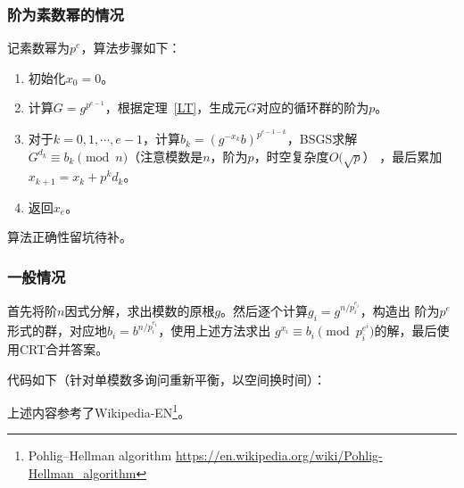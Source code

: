 \subsubsection{阶为素数幂的情况}

记素数幂为$p^e$，算法步骤如下：

\begin{enumerate}
    \item 初始化$x_0=0$。
    \item 计算$G=g^{p^{e-1}}$，根据定理~\ref{LT}，生成元$G$对应的循环群的阶为$p$。
    \item 对于$k=0,1,\cdots,e-1$，计算$b_k=(g^{-x_k}b)^{p^{e-1-k}}$，BSGS求解
    $G^{d_k}\equiv b_k\pmod{n}$（注意模数是$n$，阶为$p$，时空复杂度$O(\sqrt{p}$）
    ，最后累加$x_{k+1}=x_k+p^kd_k$。
    \item 返回$x_e$。
\end{enumerate}

算法正确性留坑待补。

\subsubsection{一般情况}
首先将阶$n$因式分解，求出模数的原根$g$。然后逐个计算$g_i=g^{n/p_i^{e_i}}$，构造出
阶为$p^e$形式的群，对应地$b_i=b^{n/p_i^{e_i}}$，使用上述方法求出
$g^{x_i}\equiv b_i\pmod{p_i^{e^i}}$的解，最后使用CRT合并答案。

代码如下（针对单模数多询问重新平衡，以空间换时间）：


上述内容参考了Wikipedia-EN\footnote{
    Pohlig–Hellman algorithm
    \url{https://en.wikipedia.org/wiki/Pohlig-Hellman\_algorithm}
}。
